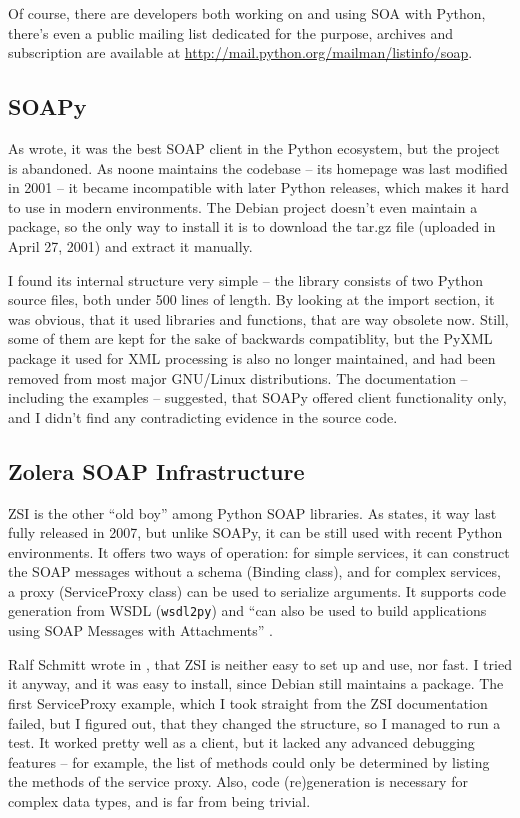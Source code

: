 Of course, there are developers both working on and using SOA with Python, there's even a public mailing list dedicated for the purpose, archives and subscription are available at \url{http://mail.python.org/mailman/listinfo/soap}.

\subsection{SOAPy}

As \cite{so-206154} wrote, it was the best SOAP client in the Python ecosystem, but the project is abandoned. As noone maintains the codebase -- its homepage was last modified in 2001 -- it became incompatible with later Python releases, which makes it hard to use in modern environments. The Debian project doesn't even maintain a package, so the only way to install it is to download the tar.gz file (uploaded in April 27, 2001) and extract it manually.

I found its internal structure very simple -- the library consists of two Python source files, both under 500 lines of length. By looking at the import section, it was obvious, that it used libraries and functions, that are way obsolete now. Still, some of them are kept for the sake of backwards compatiblity, but the PyXML package it used for XML processing is also no longer maintained, and had been removed from most major GNU/Linux distributions. The documentation -- including the examples -- suggested, that SOAPy offered client functionality only, and I didn't find any contradicting evidence in the source code.

\subsection{Zolera SOAP Infrastructure}

ZSI is the other ``old boy'' among Python SOAP libraries. As \cite{pywebsvcs-talk} states, it way last fully released in 2007, but unlike SOAPy, it can be still used with recent Python environments. It offers two ways of operation: for simple services, it can construct the SOAP messages without a schema (Binding class), and for complex services, a proxy (ServiceProxy class) can be used to serialize arguments. It supports code generation from WSDL (\verb|wsdl2py|) and ``can also be used to build applications using SOAP Messages with Attachments'' \cite{zsi-doc}.

Ralf Schmitt wrote in \cite{zsi-velocity}, that ZSI is neither easy to set up and use, nor fast. I tried it anyway, and it was easy to install, since Debian still maintains a package. The first ServiceProxy example, which I took straight from the ZSI documentation failed, but I figured out, that they changed the structure, so I managed to run a test. It worked pretty well as a client, but it lacked any advanced debugging features -- for example, the list of methods could only be determined by listing the methods of the service proxy. Also, code (re)generation is necessary for complex data types, and is far from being trivial.

